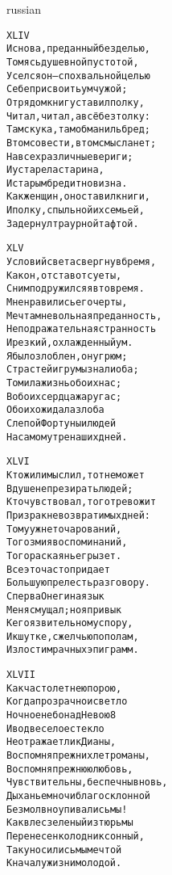\documentclass[12pt,twocolumn]{article}
\begin{document}
\begin{center}
\begin{otherlanguage*}{russian}
\begin{minipage}[t]{\dimexpr 0.5\textwidth -\tabcolsep-.5pt}
\begin{alltt}\normalfont\centering
XLIV
И снова, преданный безделью,
Томясь душевной пустотой,
Уселся он — с похвальной целью
Себе присвоить ум чужой;
Отрядом книг уставил полку,
Читал, читал, а всё без толку:
Там скука, там обман иль бред;
В том совести, в том смысла нет;
На всех различные вериги;
И устарела старина,
И старым бредит новизна.
Как женщин, он оставил книги,
И полку, с пыльной их семьей,
Задернул траурной тафтой.
\end{alltt}
\end{minipage}
\clearpage

\begin{minipage}[t]{\dimexpr 0.5\textwidth -\tabcolsep-.5pt}
\begin{alltt}\normalfont\centering
XLV
Условий света свергнув бремя,
Как он, отстав от суеты,
С ним подружился я в то время.
Мне нравились его черты,
Мечтам невольная преданность,
Неподражательная странность
И резкий, охлажденный ум.
Я был озлоблен, он угрюм;
Страстей игру мы знали оба;
Томила жизнь обоих нас;
В обоих сердца жар угас;
Обоих ожидала злоба
Слепой Фортуны и людей
На самом утре наших дней.
\end{alltt}
\end{minipage}

\begin{minipage}[t]{\dimexpr 0.5\textwidth -\tabcolsep-.5pt}
\begin{alltt}\normalfont\centering
XLVI
Кто жил и мыслил, тот не может
В душе не презирать людей;
Кто чувствовал, того тревожит
Призрак невозвратимых дней:
Тому уж нет очарований,
Того змия воспоминаний,
Того раскаянье грызет.
Все это часто придает
Большую прелесть разговору.
Сперва Онегина язык
Меня смущал; но я привык
К его язвительному спору,
И к шутке, с желчью пополам,
И злости мрачных эпиграмм.
\end{alltt}
\end{minipage}
\clearpage

\begin{minipage}[t]{\dimexpr 0.5\textwidth -\tabcolsep-.5pt}
\begin{alltt}\normalfont\centering
XLVII
Как часто летнею порою,
Когда прозрачно и светло
Ночное небо над Невою 8
И вод веселое стекло
Не отражает лик Дианы,
Воспомня прежних лет романы,
Воспомня прежнюю любовь,
Чувствительны, беспечны вновь,
Дыханьем ночи благосклонной
Безмолвно упивались мы!
Как в лес зеленый из тюрьмы
Перенесен колодник сонный,
Так уносились мы мечтой
К началу жизни молодой.
\end{alltt}
\end{minipage}


\end{otherlanguage*}
\end{center}
\end{document}
